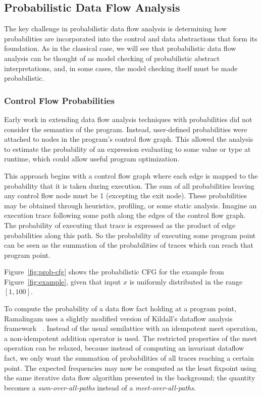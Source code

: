 \subsection{Probabilistic Data Flow Analysis}
\label{sec:pdfa}

The key challenge in probabilistic data flow analysis is
determining how probabilities are incorporated into the control
and data abstractions that form its foundation.
As in the classical case, we will see that probabilistic data flow analysis
can be thought of as model checking
of probabilistic abstract interpretations, and, in some
cases, the model checking itself must be made probabilistic.

\subsubsection{Control Flow Probabilities}
Early work in extending data flow analysis 
techniques with probabilities did not consider
the semantics of the program. 
Instead, user-defined probabilities 
were attached to nodes in the program's control flow graph.  
This allowed the analysis to estimate
the probability of an expression evaluating 
to some value or type at runtime, which could 
allow useful program optimization.

This approach begins with a control flow graph where each edge is 
mapped to the probability that it is taken during execution.
The sum of all probabilities leaving any control flow node must be 1
(excepting the exit node).
These probabilities may be obtained through heuristics, profiling,
or some static analysis.
Imagine an execution trace following some path along the edges of
the control flow graph.
The probability of executing that trace is expressed as the product of 
edge probabilities along this path.
So the probability of executing some program point can be seen as the
summation of the probabilities of traces which can reach that program point.


Figure~\ref{fig:prob-cfg} shows the probabilistic CFG for the
example from Figure~\ref{fig:example}, given that input $x$
is uniformly distributed in the range $[1,100]$.

To compute the probability of a data flow fact holding 
at a program point, Ramalingam uses a slightly
modified version of Kildall's dataflow analysis framework
~\cite{ramalingam1996data}.
Instead of the usual semilattice with an idempotent meet
operation, a non-idempotent addition operator is used.
The restricted properties of the meet operation can be
relaxed, because instead of computing an invariant dataflow
fact, we only want the summation of probabilities of all
traces reaching a certain point.
The expected frequencies may now be computed as the least
fixpoint using the same iterative data flow algorithm presented
in the background; the quantity becomes a
{\sl sum-over-all-paths} instead of a {\sl meet-over-all-paths}.

